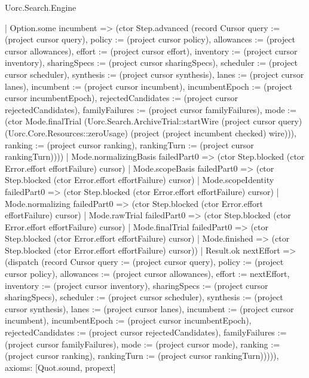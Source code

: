 \begin{lexlean}{Uorc.Search.Engine}
\begin{semanticmodule}
{          | Option.some incumbent => (ctor Step.advanced (record Cursor {query := (project cursor query), policy := (project cursor policy), allowances := (project cursor allowances), effort := (project cursor effort), inventory := (project cursor inventory), sharingSpecs := (project cursor sharingSpecs), scheduler := (project cursor scheduler), synthesis := (project cursor synthesis), lanes := (project cursor lanes), incumbent := (project cursor incumbent), incumbentEpoch := (project cursor incumbentEpoch), rejectedCandidates := (project cursor rejectedCandidates), familyFailures := (project cursor familyFailures), mode := (ctor Mode.finalTrial (Uorc.Search.ArchiveTrial::startWire (project cursor query) (Uorc.Core.Resources::zeroUsage) (project (project incumbent checked) wire))), ranking := (project cursor ranking), rankingTurn := (project cursor rankingTurn)})))
        | Mode.normalizingBasis failedPart0 => (ctor Step.blocked (ctor Error.effort effortFailure) cursor)
        | Mode.scopeBasis failedPart0 => (ctor Step.blocked (ctor Error.effort effortFailure) cursor)
        | Mode.scopeIdentity failedPart0 => (ctor Step.blocked (ctor Error.effort effortFailure) cursor)
        | Mode.normalizing failedPart0 => (ctor Step.blocked (ctor Error.effort effortFailure) cursor)
        | Mode.rawTrial failedPart0 => (ctor Step.blocked (ctor Error.effort effortFailure) cursor)
        | Mode.finalTrial failedPart0 => (ctor Step.blocked (ctor Error.effort effortFailure) cursor)
        | Mode.finished => (ctor Step.blocked (ctor Error.effort effortFailure) cursor))
      | Result.ok nextEffort => (dispatch (record Cursor {query := (project cursor query), policy := (project cursor policy), allowances := (project cursor allowances), effort := nextEffort, inventory := (project cursor inventory), sharingSpecs := (project cursor sharingSpecs), scheduler := (project cursor scheduler), synthesis := (project cursor synthesis), lanes := (project cursor lanes), incumbent := (project cursor incumbent), incumbentEpoch := (project cursor incumbentEpoch), rejectedCandidates := (project cursor rejectedCandidates), familyFailures := (project cursor familyFailures), mode := (project cursor mode), ranking := (project cursor ranking), rankingTurn := (project cursor rankingTurn)})))),
  axioms: [Quot.sound, propext]
}


\end{semanticmodule}
\end{lexlean}
